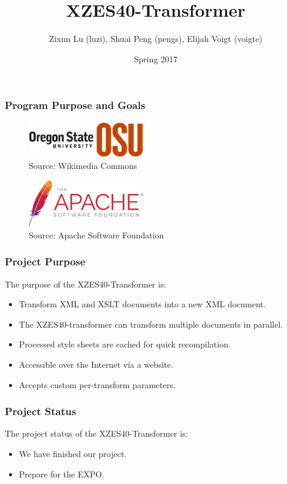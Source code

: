 \documentclass{beamer}
\title{XZES40-Transformer}
\author{Zixun Lu (luzi),
  Shuai Peng (pengs),
  Elijah Voigt (voigte)}
\institute{CS 462 | CS Senior Capstone | Group \#40}
\date{Spring 2017}
\begin{document}
 
\frame{\titlepage}

\begin{frame}
  \frametitle{Program Purpose and Goals }
\begin{figure}
  \centering
    \includegraphics[width=0.45\textwidth]{figures/osu-logo}
    \caption{Source: Wikimedia Commons \cite{osu-logo}}
\end{figure}

\begin{figure}
  \centering
    \includegraphics[width=0.45\textwidth]{figures/asf-logo}
    \caption{Source: Apache Software Foundation \cite{asf-logo}}
\end{figure}
\end{frame}

\begin{frame}
  \frametitle{Project Purpose}
  The purpose of the XZES40-Transformer is:
  \begin{itemize}
  \item Transform XML and XSLT documents into a new XML document.
  \item The XZES40-transformer can transform multiple documents in parallel. 
  \item Processed style sheets are cached for quick recompilation.
  \item Accessible over the Internet via a website.
  \item Accepts custom per-transform parameters.
  \end{itemize}
\end{frame}

\begin{frame}
  \frametitle{Project Status}
  The project status of the XZES40-Transformer is:
  \begin{itemize}
  	\item We have finished our project.
  	\item Prepare for the EXPO.
  \end{itemize}
\end{frame}
\end{document}
